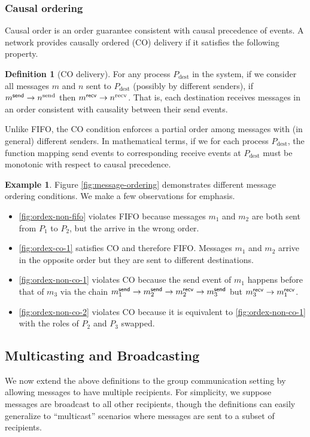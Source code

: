 \documentclass[]             %
{NASA}                       %
\theoremstyle{definition}
\newtheorem{example}[theorem]{Example}
\newtheorem{definition}[theorem]{Definition}
\providecommand{\tightlist}{%
  \setlength{\itemsep}{0pt}\setlength{\parskip}{0pt}}
\begin{document}
\subsubsection{Causal ordering}
Causal order is an order guarantee consistent with causal precedence
of events. A network provides causally ordered (CO) delivery if it
satisfies the following property.
\begin{definition}[CO delivery]
  \label{def:causalorder}
  For any process $P_\mathrm{dest}$ in the system, if we consider all
  messages $m$ and $n$ sent to $P_\mathrm{dest}$ (possibly by
  different senders), if $m_{}^{\mathsf{send}} \to n^\textrm{send}$ then
  $m_{}^{\mathsf{recv}} \to n^\textrm{recv}$. That is, each destination receives
  messages in an order consistent with causality between their send
  events.
\end{definition}
Unlike FIFO, the CO condition enforces a partial order among messages
with (in general) different senders. In mathematical terms, if we for
each process $P_{\mathrm{dest}}$, the function mapping send events to
corresponding receive events at $P_{\mathrm{dest}}$ must be monotonic
with respect to causal precedence.

\begin{example}
  Figure \ref{fig:message-ordering} demonstrates different message
  ordering conditions. We make a few observations for emphasis.

  \begin{itemize}
    \tightlist
  \item \ref{fig:ordex-non-fifo} violates FIFO because messages $m_1$
    and $m_2$ are both sent from $P_1$ to $P_2$, but the arrive in the wrong order.
  \item \ref{fig:ordex-co-1} satisfies CO and therefore FIFO. Messages
    $m_1$ and $m_2$ arrive in the opposite order but they are sent to
    different destinations.
  \item \ref{fig:ordex-non-co-1} violates CO because the send event of
    $m_1$ happens before that of $m_3$ via the chain
    $m_{1}^{\mathsf{send}} \to m_{2}^{\mathsf{send}} \to m_{2}^{\mathsf{recv}} \to m_{3}^{\mathsf{send}}$ but
    $m_{3}^{\mathsf{recv}} \to m_{1}^{\mathsf{recv}}$.
  \item \ref{fig:ordex-non-co-2} violates CO because it is equivalent to
    \ref{fig:ordex-non-co-1} with the roles of $P_2$ and $P_3$ swapped.
  \end{itemize}
\end{example}

\subsection{Multicasting and Broadcasting}
We now extend the above definitions to the group communication setting
by allowing messages to have multiple recipients. For simplicity, we
suppose messages are broadcast to all other recipients, though the
definitions can easily generalize to ``multicast'' scenarios where
messages are sent to a subset of recipients.
\end{document}
